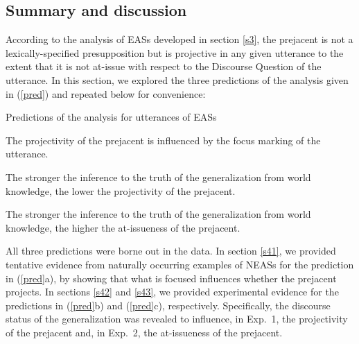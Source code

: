 \documentclass[11pt,fleqn]{article}
\newcommand{\6}{\mbox{$[\hspace*{-.6mm}[$}}
\newcommand{\9}{\mbox{$]\hspace*{-.6mm}]$}}
\begin{document}

  
\subsection{Summary and discussion}

According to the analysis of EASs developed in section \ref{s3}, the prejacent is not a lexically-specified presupposition but is projective in any given utterance to the extent that it is not at-issue with respect to the Discourse Question of the utterance. In this section, we explored the three predictions of the analysis given in (\ref{pred}) and repeated below for convenience:

\begin{exe}
\exi{(\ref{pred})} Predictions of the analysis for utterances of EASs

\begin{xlist}

\ex The projectivity of the prejacent is influenced by the focus marking of the utterance.

\ex The stronger the inference to the truth of the generalization from world knowledge, the lower the projectivity of the prejacent.

\ex The stronger the inference to the truth of the generalization from world knowledge, the higher the at-issueness of the prejacent.

\end{xlist}
\end{exe}
All three predictions were borne out in the data. In section \ref{s41}, we provided tentative evidence from naturally occurring examples of NEASs for the prediction in (\ref{pred}a), by showing that what is focused influences whether the prejacent projects. In sections \ref{s42} and \ref{s43}, we provided experimental evidence for the predictions in (\ref{pred}b) and (\ref{pred}c), respectively. Specifically, the discourse status of the generalization was revealed to influence, in Exp.~1, the projectivity of the prejacent and, in Exp.~2, the at-issueness of the prejacent. 
\end{document}
